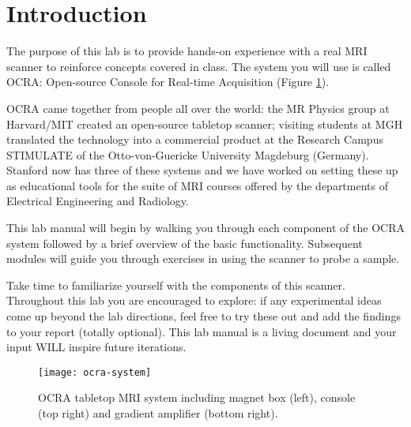 \newpage
\section{Introduction}
The purpose of this lab is to provide hands-on experience with a real MRI scanner to reinforce concepts covered in class. The system you will use is called OCRA: Open-source Console for Real-time Acquisition (Figure \ref{fig:ocra}).

OCRA came together from people all over the world: the MR Physics group at Harvard/MIT created an open-source tabletop scanner; visiting students at MGH translated the technology into a commercial product at the Research Campus STIMULATE of the Otto-von-Guericke University Magdeburg (Germany). Stanford now has three of these systems and we have worked on setting these up as educational tools for the suite of MRI courses offered by the departments of Electrical Engineering and Radiology.

This lab manual will begin by walking you through each component of the OCRA system followed by a brief overview of the basic functionality. Subsequent modules will guide you through exercises in using the scanner to probe a sample.

Take time to familiarize yourself with the components of this scanner. Throughout this lab you are encouraged to explore: if any experimental ideas come up beyond the lab directions, feel free to try these out and add the findings to your report (totally optional). This lab manual is a living document and your input WILL inspire future iterations.

\begin{figure}[h]
    \centering
    \texttt{[image: ocra-system]}
    \caption{\label{fig:ocra} OCRA tabletop MRI system including magnet box (left), console (top right) and gradient amplifier (bottom right).}
    \vspace{-5mm}
\end{figure}